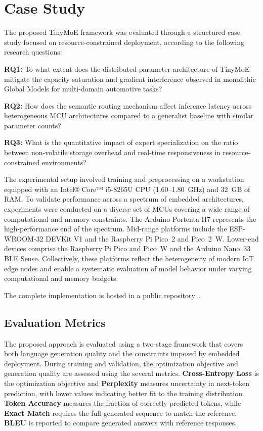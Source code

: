 \documentclass[conference]{IEEEtran}
\begin{document}
\section{Case Study}
\label{sec:case_study}

The proposed TinyMoE framework was evaluated through a structured case study focused on resource-constrained deployment, according to the following research questions:


\noindent \textbf{RQ1:} To what extent does the distributed parameter architecture of TinyMoE mitigate the capacity saturation and gradient interference observed in monolithic Global Models for multi-domain automotive tasks? 

\noindent \textbf{RQ2:} How does the semantic routing mechanism affect inference latency across heterogeneous MCU architectures compared to a generalist baseline with similar parameter counts? 

\noindent \textbf{RQ3:} What is the quantitative impact of expert specialization on the ratio between non-volatile storage overhead and real-time responsiveness in resource-constrained environments? 

The experimental setup involved training and preprocessing on a workstation equipped with an Intel® Core™ i5-8265U CPU (1.60--1.80~GHz) and 32~GB of RAM. To validate performance across a spectrum of embedded architectures, experiments were conducted on a diverse set of MCUs covering a wide range of computational and memory constraints. The Arduino Portenta H7 represents the high-performance end of the spectrum. Mid-range platforms include the ESP-WROOM-32 DEVKit V1 and the Raspberry Pi Pico~2 and Pico~2~W. Lower-end devices comprise the Raspberry Pi Pico and Pico~W and the Arduino Nano~33 BLE Sense. Collectively, these platforms reflect the heterogeneity of modern IoT edge nodes and enable a systematic evaluation of model behavior under varying computational and memory budgets.

The complete implementation is hosted in a public repository~\cite{tinyMoE}.

\subsection{Evaluation Metrics}
\label{subsec:eval_metrics}



The proposed approach is evaluated using a two-stage framework that covers both language generation quality and the constraints imposed by embedded deployment. During training and validation, the optimization objective and generation quality are assessed using the several metrics. \textbf{Cross-Entropy Loss} is the optimization objective and \textbf{Perplexity} measures uncertainty in next-token prediction, with lower values indicating better fit to the training distribution. \textbf{Token Accuracy} measures the fraction of correctly predicted tokens, while \textbf{Exact Match} requires the full generated sequence to match the reference. \textbf{BLEU} is reported to compare generated answers with reference responses.
\end{document}

